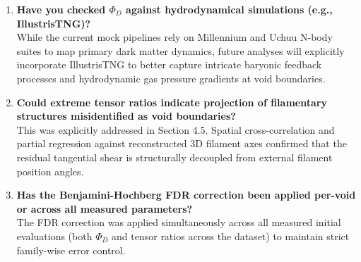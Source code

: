 \documentclass[trackchanges]{aastex631}
\begin{document}
\begin{enumerate}
    \item \textbf{Have you checked $\Phi_D$ against hydrodynamical simulations (e.g., IllustrisTNG)?} \\
    While the current mock pipelines rely on Millennium and Uchuu N-body suites to map primary dark matter dynamics, future analyses will explicitly incorporate IllustrisTNG to better capture intricate baryonic feedback processes and hydrodynamic gas pressure gradients at void boundaries.

    \item \textbf{Could extreme tensor ratios indicate projection of filamentary structures misidentified as void boundaries?} \\
    This was explicitly addressed in Section 4.5. Spatial cross-correlation and partial regression against reconstructed 3D filament axes confirmed that the residual tangential shear is structurally decoupled from external filament position angles.

    \item \textbf{Has the Benjamini-Hochberg FDR correction been applied per-void or across all measured parameters?} \\
    The FDR correction was applied simultaneously across all measured initial evaluations (both $\Phi_D$ and tensor ratios across the dataset) to maintain strict family-wise error control.
\end{enumerate}



\end{document}
